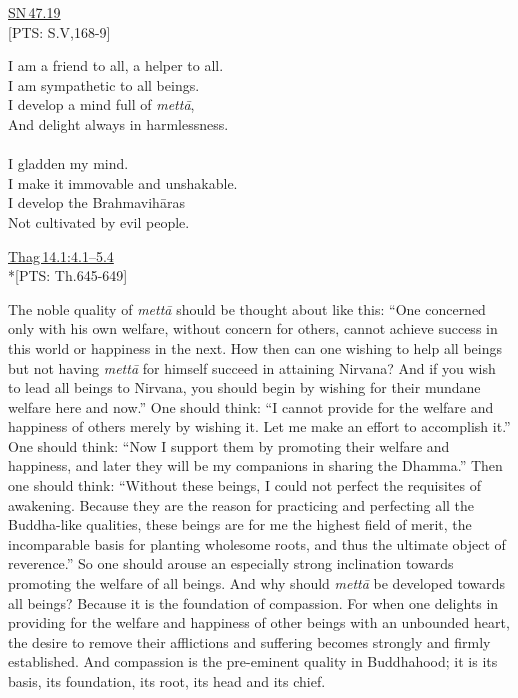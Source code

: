 \documentclass[10pt, openright]{book}
\begin{document}
\begin{flushright}
\href{https://suttacentral.net/sn47.19/en/sujato}{SN 47.19}\\

[PTS: S.V,168-9]


\end{flushright}


\begin{itemize}


I am a friend to all, a helper to all. \\ 
I am sympathetic to all beings. \\ 
I develop a mind full of \textit{mettā}, \\ 
And delight always in harmlessness. \\ 
 \\ 
I gladden my mind. \\ 
I make it immovable and unshakable. \\ 
I develop the Brahmavihāras \\ 
Not cultivated by evil people.


\end{itemize}
\begin{flushright}
\href{https://suttacentral.net/thag14.1/en/sujato\#4.1}{Thag 14.1:4.1–5.4}\\

*[PTS: Th.645-649]


\end{flushright}
The noble quality of \textit{mettā} should be thought about like this: “One concerned only with his own welfare, without concern for others, cannot achieve success in this world or happiness in the next. How then can one wishing to help all beings but not having \textit{mettā} for himself succeed in attaining Nirvana? And if you wish to lead all beings to Nirvana, you should begin by wishing for their mundane welfare here and now.” One should think: “I cannot provide for the welfare and happiness of others merely by wishing it. Let me make an effort to accomplish it.” One should think: “Now I support them by promoting their welfare and happiness, and later they will be my companions in sharing the Dhamma.” Then one should think: “Without these beings, I could not perfect the requisites of awakening. Because they are the reason for practicing and perfecting all the Buddha-like qualities, these beings are for me the highest field of merit, the incomparable basis for planting wholesome roots, and thus the ultimate object of reverence.” So one should arouse an especially strong inclination towards promoting the welfare of all beings. And why should \textit{mettā} be developed towards all beings? Because it is the foundation of compassion. For when one delights in providing for the welfare and happiness of other beings with an unbounded heart, the desire to remove their afflictions and suffering becomes strongly and firmly established. And compassion is the pre-eminent quality in Buddhahood; it is its basis, its foundation, its root, its head and its chief.
\end{document}
